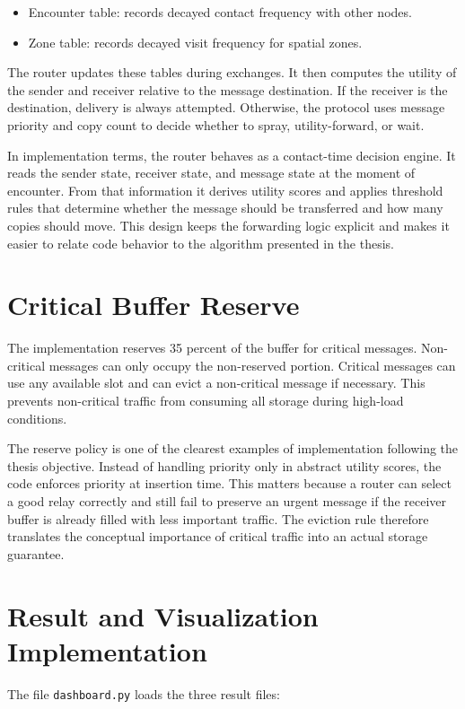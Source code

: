 \begin{itemize}
	\item Encounter table: records decayed contact frequency with other nodes.
	\item Zone table: records decayed visit frequency for spatial zones.
\end{itemize}

The router updates these tables during exchanges. It then computes the utility of the sender and receiver relative to the message destination. If the receiver is the destination, delivery is always attempted. Otherwise, the protocol uses message priority and copy count to decide whether to spray, utility-forward, or wait.

In implementation terms, the router behaves as a contact-time decision engine. It reads the sender state, receiver state, and message state at the moment of encounter. From that information it derives utility scores and applies threshold rules that determine whether the message should be transferred and how many copies should move. This design keeps the forwarding logic explicit and makes it easier to relate code behavior to the algorithm presented in the thesis.

\section{Critical Buffer Reserve}
The implementation reserves 35 percent of the buffer for critical messages. Non-critical messages can only occupy the non-reserved portion. Critical messages can use any available slot and can evict a non-critical message if necessary. This prevents non-critical traffic from consuming all storage during high-load conditions.

The reserve policy is one of the clearest examples of implementation following the thesis objective. Instead of handling priority only in abstract utility scores, the code enforces priority at insertion time. This matters because a router can select a good relay correctly and still fail to preserve an urgent message if the receiver buffer is already filled with less important traffic. The eviction rule therefore translates the conceptual importance of critical traffic into an actual storage guarantee.

\section{Result and Visualization Implementation}
The file \verb|dashboard.py| loads the three result files:

